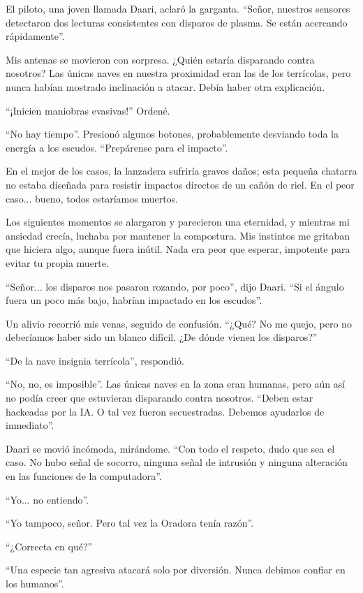 El piloto, una joven llamada Daari, aclaró la garganta. ``Señor, nuestros sensores detectaron dos lecturas consistentes con disparos de plasma. Se están acercando rápidamente''.

Mis antenas se movieron con sorpresa. ¿Quién estaría disparando contra nosotros? Las únicas naves en nuestra proximidad eran las de los terrícolas, pero nunca habían mostrado inclinación a atacar. Debía haber otra explicación.

``¡Inicien maniobras evasivas!'' Ordené.

``No hay tiempo''. Presionó algunos botones, probablemente desviando toda la energía a los escudos. ``Prepárense para el impacto''.

En el mejor de los casos, la lanzadera sufriría graves daños; esta pequeña chatarra no estaba diseñada para resistir impactos directos de un cañón de riel. En el peor caso... bueno, todos estaríamos muertos.

Los siguientes momentos se alargaron y parecieron una eternidad, y mientras mi ansiedad crecía, luchaba por mantener la compostura. Mis instintos me gritaban que hiciera algo, aunque fuera inútil. Nada era peor que esperar, impotente para evitar tu propia muerte.

``Señor... los disparos nos pasaron rozando, por poco'', dijo Daari. ``Si el ángulo fuera un poco más bajo, habrían impactado en los escudos''.

Un alivio recorrió mis venas, seguido de confusión. ``¿Qué? No me quejo, pero no deberíamos haber sido un blanco difícil. ¿De dónde vienen los disparos?''

``De la nave insignia terrícola'', respondió.

``No, no, es imposible''. Las únicas naves en la zona eran humanas, pero aún así no podía creer que estuvieran disparando contra nosotros. ``Deben estar hackeadas por la IA. O tal vez fueron secuestradas. Debemos ayudarlos de inmediato''.

Daari se movió incómoda, mirándome. ``Con todo el respeto, dudo que sea el caso. No hubo señal de socorro, ninguna señal de intrusión y ninguna alteración en las funciones de la computadora''.

``Yo... no entiendo''.

``Yo tampoco, señor. Pero tal vez la Oradora tenía razón''.

``¿Correcta en qué?''

``Una especie tan agresiva atacará solo por diversión. Nunca debimos confiar en los humanos''.

